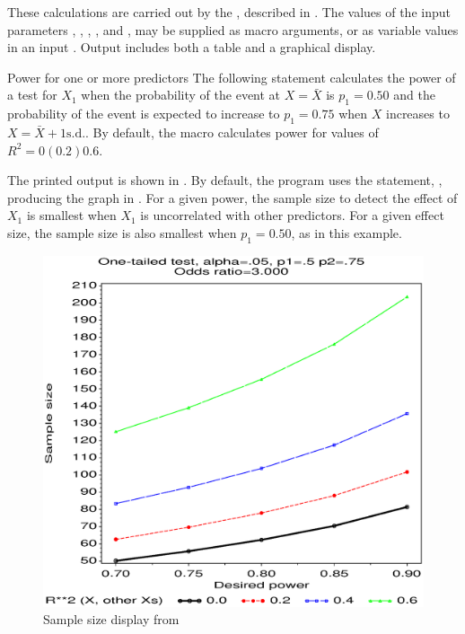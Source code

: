 These calculations are carried out by the ,
described in .
The values of the input parameters
, , , , and ,
may be supplied as macro arguments, or as variable values in an
input \Dset.
Output includes both a table and a graphical display.
\begin{Example}[power1]{Power for one or more predictors}
The following statement calculates the power of a test for $X_1$
when the probability of the event at $X = \bar{X}$ is $p_1 = 0.50$
and the probability of the event is expected to increase to
$p_1 = 0.75$ when $X$ increases to $X = \bar{X} + 1\mbox{s.d.}$.
By default, the macro calculates power for values of $R^2 = 0 (0.2) 0.6$.

\begin{listing}
\end{listing}

The printed output is shown in .
By default, the program uses the  statement,
, producing the graph
in .
For a given power, the sample size to detect the effect of $X_1$ is smallest when $X_1$ is uncorrelated with other predictors.
For a given effect size, the sample size is also smallest when
$p_1 = 0.50$, as in this example.
\begin{Output}[htb]
\caption{Power table from }\label{out:powerlog.1}
\small

\end{Output}

\begin{figure}[htb]
  \centering
  \includegraphics[scale=.6,clip]{ch6/fig/powerlog}
  \caption{Sample size display from }%
  \label{fig:powerlog}
\end{figure}
\end{Example}

